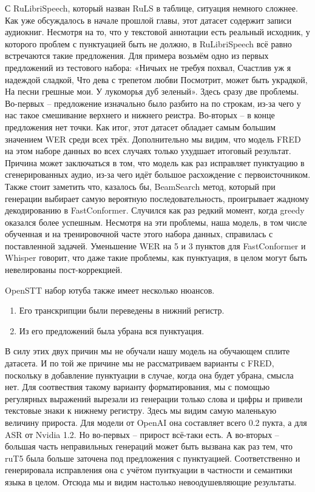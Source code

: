 С RuLibriSpeech, который назван RuLS в таблице, ситуация немного сложнее.
Как уже обсуждалось в начале прошлой главы, этот датасет содержит записи аудиокниг.
Несмотря на то, что у текстовой аннотации есть реальный исходник, у которого проблем с пунктуацией быть не должно, в RuLibriSpeech всё равно встречаются такие предложения.
Для примера возьмём одно из первых предложений из тестового набора:
«Ничьих не требуя похвал, Счастлив уж я надеждой сладкой, Что дева с трепетом любви Посмотрит, может быть украдкой, На песни грешные мои. У лукоморья дуб зеленый».
Здесь сразу две проблемы.
Во-первых -- предложение изначально было разбито на по строкам, из-за чего у нас такое смешивание верхнего и нижнего реистра.
Во-вторых -- в конце предложения нет точки.
Как итог, этот датасет обладает самым большим значением WER среди всех трёх.
Дополнительно мы видим, что модель FRED на этом наборе данных во всех случаях только ухудшает итоговый результат.
Причина может заключаться в том, что модель как раз исправляет пунктуацию в сгенерированных аудио, из-за чего идёт большое расхождение с первоисточником.
Также стоит заметить что, казалось бы, BeamSearch метод, который при генерации выбирает самую вероятную последовательность, проигрывает жадному декодированию в FastConformer.
Случился как раз редкий момент, когда greedy оказался более успешным.
Несмотря на эти проблемы, наша модель, в том числе обученная  и на тренировочной часте этого набора данных, справилась с поставленной задачей.
Уменьшение WER на 5 и 3 пунктов для FastConformer и Whisper говорит, что даже такие проблемы, как пунктуация, в целом могут быть невелированы пост-коррекцией.

OpenSTT набор ютуба также имеет несколько нюансов.
\begin{enumerate}
  \item Его транскрипции были переведены в нижний регистр.
  \item Из его предложений была убрана вся пунктуация.
\end{enumerate}

В силу этих двух причин мы не обучали нашу модель на обучающем сплите датасета.
И по той же причине мы не рассматриваем варианты с FRED, поскольку в добавление пунктуации в случае, когда она будет убрана, смысла нет.
Для соотвествия такому варианту форматирования, мы с помощью регулярных выражений вырезали из генерации только слова и цифры и привели текстовые знаки к нижнему регистру.
Здесь мы видим самую маленькую величину прироста.
Для модели от OpenAI она составляет всего 0.2 пукта, а для ASR от Nvidia 1.2.
Но во-первых -- прирост всё-таки есть.
А во-вторых -- большая часть неправильных генераций может быть вызвана как раз тем, что ruT5 была больше заточена под предложения с пунктуацией.
Соответственно и генерировала исправления она с учётом пунткуации в частности и семантики языка в целом.
Отсюда мы и видим настолько невоодушевляющие результаты.

